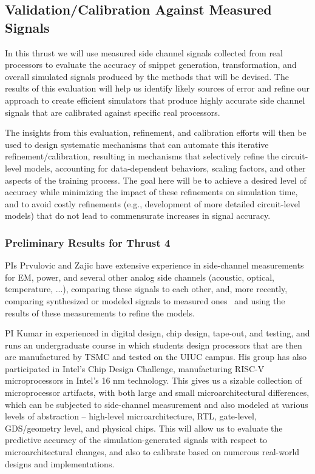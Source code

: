 \subsection{Validation/Calibration Against Measured Signals}

In this thrust we will use measured side channel signals collected from real processors to
evaluate the accuracy of snippet generation, transformation, and overall simulated signals produced by the methods that will be devised. The results of this evaluation will help us identify likely sources of error and refine our approach to create efficient simulators that produce highly accurate side channel signals that are calibrated against specific real processors.

The insights from this evaluation, refinement, and calibration efforts will then be used to design systematic mechanisms that can automate this iterative refinement/calibration, resulting in mechanisms that selectively refine the circuit-level models, accounting for data-dependent behaviors, scaling factors, and other aspects of the training process. The goal here will be to achieve a desired level of accuracy while minimizing the impact of these refinements on simulation time, and to avoid costly refinements (e.g., development of more detailed circuit-level models) that do not lead to commensurate increases in signal accuracy.

\subsubsection{Preliminary Results for Thrust 4}

PIs Prvulovic and Zajic have extensive experience in side-channel measurements for EM, power, and several other analog side channels (acoustic, optical, temperature, ...), comparing these signals to each other, and, more recently, comparing synthesized or modeled signals to measured ones~\cite{Nader2020} and using the results of these measurements to refine the models.

PI Kumar in experienced in digital design, chip design,
tape-out, and testing, and runs an undergraduate course in which students design processors that are then are manufactured by TSMC and tested on the UIUC campus.
His group has also participated in Intel's Chip Design Challenge, manufacturing RISC-V microprocessors in Intel's 16 nm technology. This gives us a sizable collection of microprocessor artifacts, with both large and small microarchitectural differences,
which can be subjected to side-channel measurement and also modeled at various levels of abstraction -- high-level microarchitecture, RTL, gate-level,
GDS/geometry level, and physical chips. This will allow us to evaluate the predictive accuracy of the simulation-generated signals with respect to microarchitectural changes,
and also to calibrate based on numerous real-world designs and implementations.

